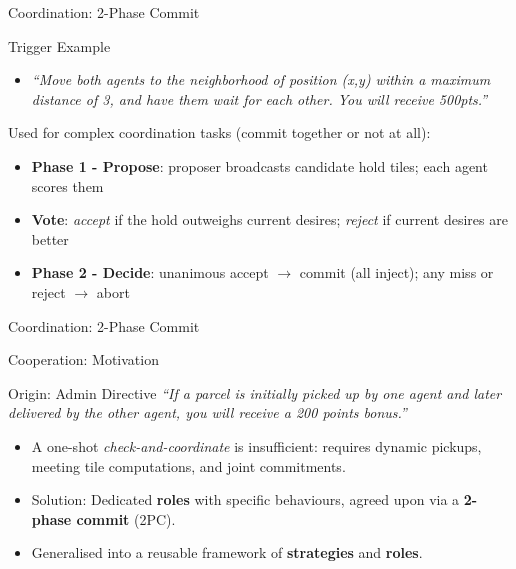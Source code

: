 \begin{frame}{Coordination: 2-Phase Commit}
  \begin{exampleblock}{Trigger Example}
    \begin{itemize}
      \item \textit{``Move both agents to the neighborhood of position (x,y) within a maximum distance of 3, and have them wait for each other. You will receive 500pts.''}
    \end{itemize}
  \end{exampleblock}
  
  \vspace{1em}
  
  Used for complex coordination tasks (commit together or not at all):
  \begin{itemize}
    \item \textbf{Phase 1 - Propose}: proposer broadcasts candidate hold tiles; each agent scores them
    \item \textbf{Vote}: \emph{accept} if the hold outweighs current desires; \emph{reject} if current desires are better
    \item \textbf{Phase 2 - Decide}: unanimous accept $\to$ commit (all inject); any miss or reject $\to$ abort
  \end{itemize}
\end{frame}

\begin{frame}{Coordination: 2-Phase Commit}
  \centering
  \resizebox{0.95\textwidth}{!}{}
\end{frame}

\begin{frame}{Cooperation: Motivation}
  \begin{exampleblock}{Origin: Admin Directive}
    \textit{``If a parcel is initially picked up by one agent and later delivered by the other agent, you will receive a 200 points bonus.''}
  \end{exampleblock}

  \vspace{1em}
  \begin{itemize}
    \item A one-shot \emph{check-and-coordinate} is insufficient: requires dynamic pickups, meeting tile computations, and joint commitments.
    \item[$\Rightarrow$] Solution: Dedicated \textbf{roles} with specific behaviours, agreed upon via a \textbf{2-phase commit} (2PC).
    \item Generalised into a reusable framework of \textbf{strategies} and \textbf{roles}.
  \end{itemize}
\end{frame}

